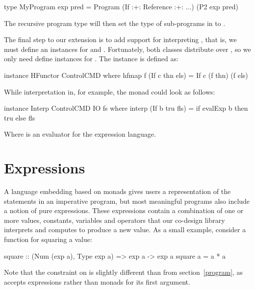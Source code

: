 \documentclass[../paper.tex]{subfiles}
\begin{document}
\begin{code}
type MyProgram exp pred = Program (If :+: Reference :+: ...) (P2 exp pred)
\end{code}

\noindent The recursive program type will then set the type of sub-programs in  to .

The final step to our extension is to add support for interpreting , that is, we must define an instances for  and . Fortunately, both classes distribute over \codei{(:+:)}, so we only need define instances for . The  instance is defined as:

\begin{code}
instance HFunctor ControlCMD where
  hfmap f (If c thn els) = If c (f thn) (f els)
\end{code}

\noindent While interpretation in, for example, the  monad could look as follows:

\begin{code}
instance Interp ControlCMD IO fs where
  interp (If b tru fls) = if evalExp b then tru else fls
\end{code}

\noindent Where  is an evaluator for the expression language.

\section{Expressions}
\label{expr}

A language embedding based on monads gives users a representation of the statements in an imperative program, but most meaningful programs also include a notion of pure expressions. These expressions contain a combination of one or more values, constants, variables and operators that our co-design library interprets and computes to produce a new value. As a small example, consider a function for squaring a value:

\begin{code}
square :: (Num (exp a), Type exp a) => exp a -> exp a
square a = a * a
\end{code}

\noindent Note that the  constraint on  is slightly different than  from section~\ref{program}, as  accepts expressions rather than monads for its first argument.
\end{document}
